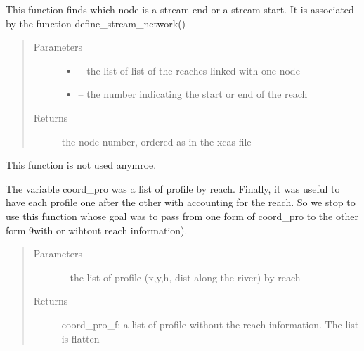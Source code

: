 \documentclass[letterpaper,10pt,english]{sphinxmanual}
\begin{document}

\begin{fulllineitems}
\label{\detokenize{index:src.mascaret.find_node}}
This function finds which node is a stream end or a stream start. It is associated by the function
define\_stream\_network()
\begin{quote}\begin{description}
\item[{Parameters}] \leavevmode\begin{itemize}
\item {} 
 -- the list of list of the reaches linked with one node

\item {} 
 -- the number indicating the start or end of the reach

\end{itemize}

\item[{Returns}] \leavevmode
the node number, ordered as in the xcas file

\end{description}\end{quote}

\end{fulllineitems}


\begin{fulllineitems}
\label{\detokenize{index:src.mascaret.flat_coord_pro}}
This function is not used anymroe.

The variable coord\_pro was a list of profile by reach. Finally, it was useful to have each profile one after the
other with accounting for the reach. So we stop to use this function whose goal was to pass from one form of
coord\_pro to the other form 9with or wihtout reach information).
\begin{quote}\begin{description}
\item[{Parameters}] \leavevmode
{} -- the list of profile (x,y,h, dist along the river) by reach

\item[{Returns}] \leavevmode
coord\_pro\_f: a list of profile without the reach information. The list is flatten

\end{description}\end{quote}

\end{fulllineitems}
\end{document}
